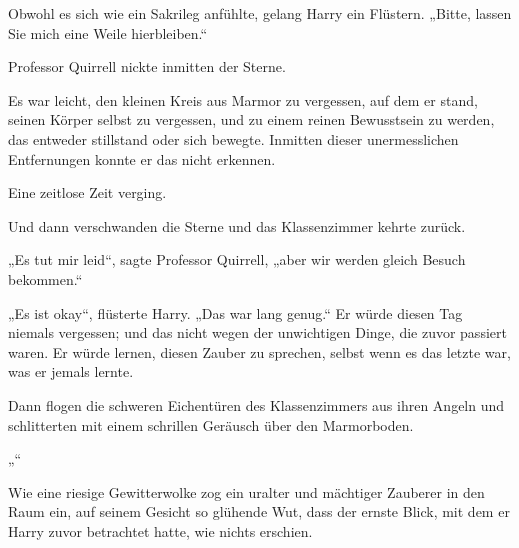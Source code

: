 Obwohl es sich wie ein Sakrileg anfühlte, gelang Harry ein Flüstern. „Bitte, lassen Sie mich eine Weile hierbleiben.“

Professor Quirrell nickte inmitten der Sterne.

Es war leicht, den kleinen Kreis aus Marmor zu vergessen, auf dem er stand, seinen Körper selbst zu vergessen, und zu einem reinen Bewusstsein zu werden, das entweder stillstand oder sich bewegte. Inmitten dieser unermesslichen Entfernungen konnte er das nicht erkennen.

Eine zeitlose Zeit verging.

Und dann verschwanden die Sterne und das Klassenzimmer kehrte zurück.

„Es tut mir leid“, sagte Professor Quirrell, „aber wir werden gleich Besuch bekommen.“

„Es ist okay“, flüsterte Harry. „Das war lang genug.“ Er würde diesen Tag niemals vergessen; und das nicht wegen der unwichtigen Dinge, die zuvor passiert waren. Er würde lernen, diesen Zauber zu sprechen, selbst wenn es das letzte war, was er jemals lernte.

Dann flogen die schweren Eichentüren des Klassenzimmers aus ihren Angeln und schlitterten mit einem schrillen Geräusch über den Marmorboden.

„“

Wie eine riesige Gewitterwolke zog ein uralter und mächtiger Zauberer in den Raum ein, auf seinem Gesicht so glühende Wut, dass der ernste Blick, mit dem er Harry zuvor betrachtet hatte, wie nichts erschien.

